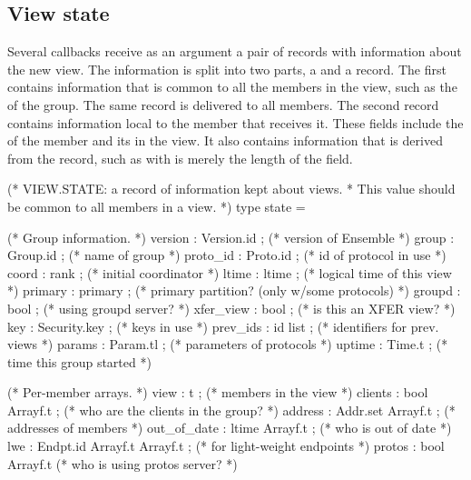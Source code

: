\subsection{View state}

Several callbacks receive as an argument a pair of records with
information about the new view.  The information is split into two
parts, a  and a  record.  The
first contains information that is common to all the members in the
view, such as the  of the group.  The same record is
delivered to all members.  The second record contains information
local to the member that receives it.  These fields include the
 of the member and its  in the view.  It
also contains information that is derived from the 
record, such as  with is merely the length of the
 field.

\begin{codebox}
(* VIEW.STATE: a record of information kept about views.
 * This value should be common to all members in a view.
 *)
type state = {
  (* Group information.
   *)
  version       : Version.id ;		(* version of Ensemble *)
  group		: Group.id ;		(* name of group *)
  proto_id	: Proto.id ;		(* id of protocol in use *)
  coord         : rank ;		(* initial coordinator *)
  ltime         : ltime ;		(* logical time of this view *)
  primary       : primary ;		(* primary partition? (only w/some protocols) *)
  groupd        : bool ;		(* using groupd server? *)
  xfer_view	: bool ;		(* is this an XFER view? *)
  key		: Security.key ;	(* keys in use *)
  prev_ids      : id list ;             (* identifiers for prev. views *)
  params        : Param.tl ;		(* parameters of protocols *)
  uptime        : Time.t ;		(* time this group started *)

  (* Per-member arrays.
   *)
  view 		: t ;			(* members in the view *)
  clients	: bool Arrayf.t ;	(* who are the clients in the group? *)
  address       : Addr.set Arrayf.t ;	(* addresses of members *)
  out_of_date   : ltime Arrayf.t	; (* who is out of date *)
  lwe           : Endpt.id Arrayf.t Arrayf.t ; (* for light-weight endpoints *)
  protos        : bool Arrayf.t  	(* who is using protos server? *)
}
\end{codebox}

